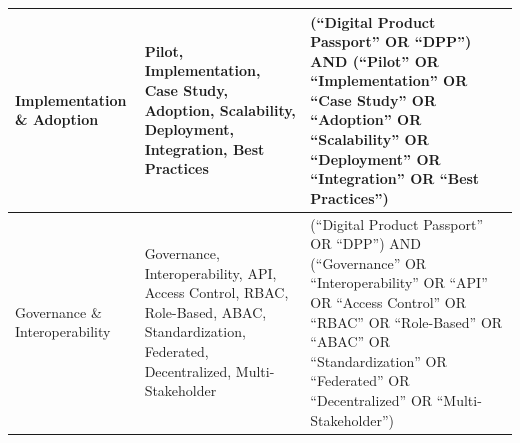 \begin{table}[htbp]
\begin{tabularx}{\textwidth}{|
      >{\arraybackslash}X|
      >{\arraybackslash}X|
      >{\arraybackslash}X|}
      \hline
      Implementation \& Adoption & 
        Pilot, Implementation, Case Study, Adoption, Scalability, Deployment, Integration, Best Practices & 
        (``Digital Product Passport'' OR ``DPP'') AND (``Pilot'' OR ``Implementation'' OR ``Case Study'' OR ``Adoption'' OR ``Scalability'' OR ``Deployment'' OR ``Integration'' OR ``Best Practices'') \\
      \hline
      Governance \& Interoperability & 
        Governance, Interoperability, API, Access Control, RBAC, Role-Based, ABAC, Standardization, Federated, Decentralized, Multi-Stakeholder & 
        (``Digital Product Passport'' OR ``DPP'') AND (``Governance'' OR ``Interoperability'' OR ``API'' OR ``Access Control'' OR ``RBAC'' OR ``Role-Based'' OR ``ABAC'' OR ``Standardization'' OR ``Federated'' OR ``Decentralized'' OR ``Multi-Stakeholder'') \\
      \hline
    \end{tabularx}
  \label{tab:literature_keyword_search}
\end{table}

